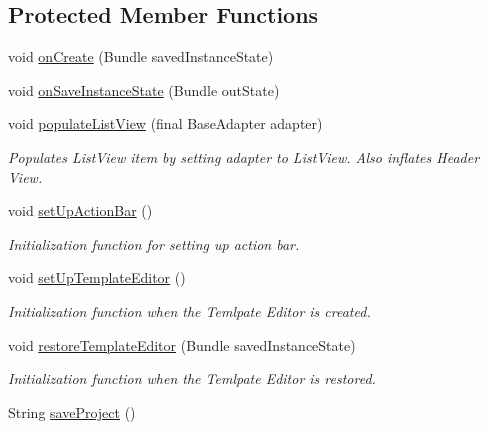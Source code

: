 \subsection*{Protected Member Functions}
\begin{DoxyCompactItemize}
\item 
void \hyperlink{classorg_1_1buildmlearn_1_1toolkit_1_1activity_1_1TemplateEditor_abe4f4b6fa4f8ca3bc10f9c01e3b81f73}{on\-Create} (Bundle saved\-Instance\-State)
\item 
void \hyperlink{classorg_1_1buildmlearn_1_1toolkit_1_1activity_1_1TemplateEditor_a6f0e3399d8b62597bfed2bb402d44ae0}{on\-Save\-Instance\-State} (Bundle out\-State)
\item 
void \hyperlink{classorg_1_1buildmlearn_1_1toolkit_1_1activity_1_1TemplateEditor_ade293345372081f3d43450df42e26092}{populate\-List\-View} (final Base\-Adapter adapter)
\begin{DoxyCompactList}\small\item\em Populates List\-View item by setting adapter to List\-View. Also inflates Header View. \end{DoxyCompactList}\item 
void \hyperlink{classorg_1_1buildmlearn_1_1toolkit_1_1activity_1_1TemplateEditor_a5bd38be8a926fff23a40e8014b71cb13}{set\-Up\-Action\-Bar} ()
\begin{DoxyCompactList}\small\item\em Initialization function for setting up action bar. \end{DoxyCompactList}\item 
void \hyperlink{classorg_1_1buildmlearn_1_1toolkit_1_1activity_1_1TemplateEditor_a064ac90668a94f32256938cb08fe896e}{set\-Up\-Template\-Editor} ()
\begin{DoxyCompactList}\small\item\em Initialization function when the Temlpate Editor is created. \end{DoxyCompactList}\item 
void \hyperlink{classorg_1_1buildmlearn_1_1toolkit_1_1activity_1_1TemplateEditor_a957831b300058bc26fbfc187517962a8}{restore\-Template\-Editor} (Bundle saved\-Instance\-State)
\begin{DoxyCompactList}\small\item\em Initialization function when the Temlpate Editor is restored. \end{DoxyCompactList}\item 
String \hyperlink{classorg_1_1buildmlearn_1_1toolkit_1_1activity_1_1TemplateEditor_aaec7f80eb29a74505a25bed11c20c29d}{save\-Project} ()

\end{DoxyCompactItemize}
